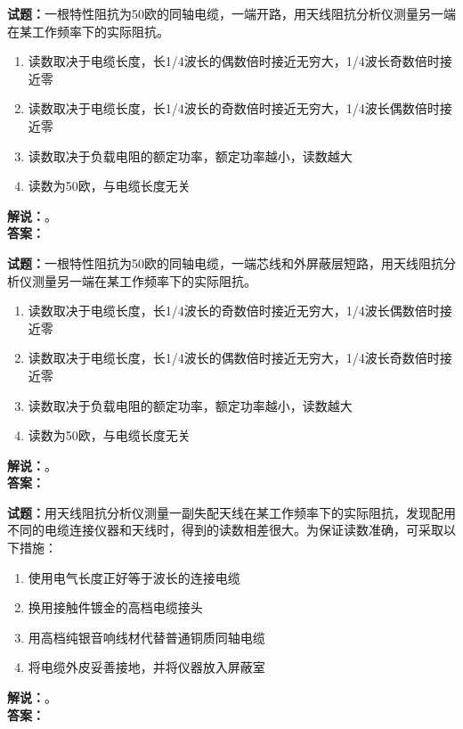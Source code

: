 \documentclass{ctexbook}
\begin{document}
\bigskip




\noindent\textbf{试题：}一根特性阻抗为50欧的同轴电缆，一端开路，用天线阻抗分析仪测量另一端在某工作频率下的实际阻抗。
\begin{enumerate}[leftmargin=3em]
\item 读数取决于电缆长度，长1/4波长的偶数倍时接近无穷大，1/4波长奇数倍时接近零
\item 读数取决于电缆长度，长1/4波长的奇数倍时接近无穷大，1/4波长偶数倍时接近零
\item 读数取决于负载电阻的额定功率，额定功率越小，读数越大
\item 读数为50欧，与电缆长度无关
\end{enumerate}
\noindent\textbf{解说：}\textbf{}。\\\noindent\textbf{答案：}

\bigskip




\noindent\textbf{试题：}一根特性阻抗为50欧的同轴电缆，一端芯线和外屏蔽层短路，用天线阻抗分析仪测量另一端在某工作频率下的实际阻抗。
\begin{enumerate}[leftmargin=3em]
\item 读数取决于电缆长度，长1/4波长的奇数倍时接近无穷大，1/4波长偶数倍时接近零
\item 读数取决于电缆长度，长1/4波长的偶数倍时接近无穷大，1/4波长奇数倍时接近零
\item 读数取决于负载电阻的额定功率，额定功率越小，读数越大
\item 读数为50欧，与电缆长度无关
\end{enumerate}
\noindent\textbf{解说：}\textbf{}。\\\noindent\textbf{答案：}

\bigskip




\noindent\textbf{试题：}用天线阻抗分析仪测量一副失配天线在某工作频率下的实际阻抗，发现配用不同的电缆连接仪器和天线时，得到的读数相差很大。为保证读数准确，可采取以下措施：
\begin{enumerate}[leftmargin=3em]
\item 使用电气长度正好等于波长的连接电缆
\item 换用接触件镀金的高档电缆接头
\item 用高档纯银音响线材代替普通铜质同轴电缆
\item 将电缆外皮妥善接地，并将仪器放入屏蔽室
\end{enumerate}
\noindent\textbf{解说：}\textbf{}。\\\noindent\textbf{答案：}
\end{document}
